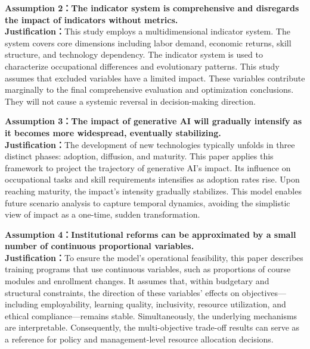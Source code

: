 \documentclass{mcmthesis}
\begin{document}
\medskip
\noindent\textbf{Assumption 2：The indicator system is comprehensive and disregards the impact of indicators without metrics.}\\
\noindent\textbf{Justification：}This study employs a multidimensional indicator system.
The system covers core dimensions including labor demand, economic returns, skill structure, and technology dependency.
The indicator system is used to characterize occupational differences and evolutionary patterns.
This study assumes that excluded variables have a limited impact.
These variables contribute marginally to the final comprehensive evaluation and optimization conclusions.
They will not cause a systemic reversal in decision-making direction.



\medskip
\noindent\textbf{Assumption 3：The impact of generative AI will gradually intensify as it becomes more widespread, eventually stabilizing.}\\
\noindent\textbf{Justification：}The development of new technologies typically unfolds in three distinct phases:
adoption, diffusion, and maturity.
This paper applies this framework to project the trajectory of generative AI's impact.
Its influence on occupational tasks and skill requirements intensifies as adoption rates rise.
Upon reaching maturity, the impact's intensity gradually stabilizes.
This model enables future scenario analysis to capture temporal dynamics,
avoiding the simplistic view of impact as a one-time, sudden transformation.

\medskip
\noindent\textbf{Assumption 4：Institutional reforms can be approximated by a small number of continuous proportional variables.}\\
\noindent\textbf{Justification：}To ensure the model's operational feasibility, this paper describes training programs that use continuous variables, such as proportions of course modules and enrollment changes. It assumes that, within budgetary and structural constraints, the direction of these variables' effects on objectives—including employability, learning quality, inclusivity, resource utilization, and ethical compliance—remains stable. Simultaneously, the underlying mechanisms are interpretable. Consequently, the multi-objective trade-off results can serve as a reference for policy and management-level resource allocation decisions.


\end{document}
